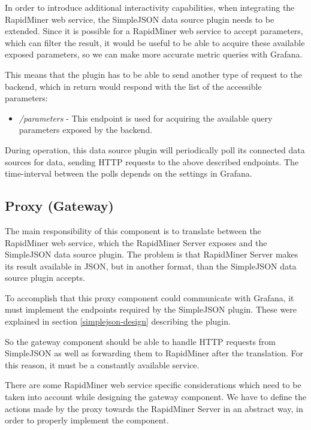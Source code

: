 In order to introduce additional interactivity capabilities, when integrating the RapidMiner web service, the SimpleJSON data source plugin needs to be extended. Since it is possible for a RapidMiner web service to accept parameters, which can filter the result, it would be useful to be able to acquire these available exposed parameters, so we can make more accurate metric queries with Grafana.

This means that the plugin has to be able to send another type of request to the backend, which in return would respond with the list of the accessible parameters:

\begin{itemize}
	\item \emph{/parameters} - This endpoint is used for acquiring the available query parameters exposed by the backend.
\end{itemize}

During operation, this data source plugin will periodically poll its connected data sources for data, sending HTTP requests to the above described endpoints. The time-interval between the polls depends on the settings in Grafana.

\subsection{Proxy (Gateway)} \label{proxy-design}

The main responsibility of this component is to translate between the RapidMiner web service, which the RapidMiner Server exposes and the SimpleJSON data source plugin. The problem is that RapidMiner Server makes its result available in JSON, but in another format, than the SimpleJSON data source plugin accepts.

To accomplish that this proxy component could communicate with Grafana, it must implement the endpoints required by the SimpleJSON plugin. These were explained in section \ref{simplejson-design} describing the plugin.

So the gateway component should be able to handle HTTP requests from SimpleJSON as well as forwarding them to RapidMiner after the translation. For this reason, it must be a constantly available service.

There are some RapidMiner web service specific considerations which need to be taken into account while designing the gateway component. We have to define the actions made by the proxy towards the RapidMiner Server in an abstract way, in order to properly implement the component.

